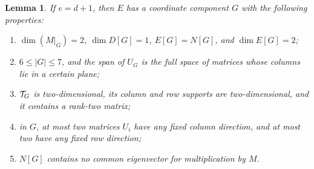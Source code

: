\documentclass[11pt,a4paper]{article}
\numberwithin{equation}{section}
\theoremstyle{plain}
\newtheorem{lemma}[theorem]{Lemma}
\theoremstyle{definition}
\newcommand{\leqs}{\leqslant}\newcommand{\geqs}{\geqslant}
\begin{document}
\begin{lemma}\label{lem:growing-block}
If $e=d+1$, then $E$ has a coordinate component $G$ with the following
properties:
\begin{enumerate}
\item $\dim(M|_G)=2$, $\dim D[G]=1$,
$E[G]=N[G]$, and $\dim E[G]=2$;
\item $6\leqs |G|\leqs7$, and the span of $U_G$ is the full space of
matrices whose columns lie in a certain plane;
\item $\mathcal T_G$ is two-dimensional, its column and row supports are
two-dimensional, and it contains a rank-two matrix;
\item in $G$, at most two matrices $U_i$ have any fixed column
direction, and at most two have any fixed row direction;
\item $N[G]$ contains no common eigenvector for multiplication by $M$.
\end{enumerate}
\end{lemma}
\end{document}
